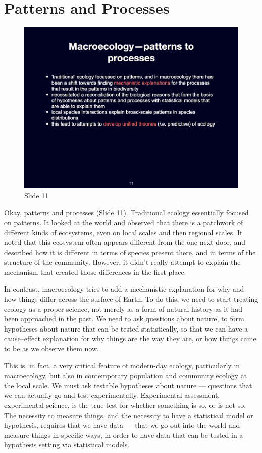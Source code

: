 \documentclass[
  11pt,
]{book}
\begin{document}
\section{Patterns and Processes}\label{patterns-and-processes}

\begin{figure}[ht]
\centering
\includegraphics[width=0.8\linewidth]{../images/BDC334/BDC334-011.jpeg}
\caption*{Slide 11}
\end{figure}

Okay, patterns and processes (Slide 11). Traditional ecology essentially
focused on patterns. It looked at the world and observed that there is a
patchwork of different kinds of ecosystems, even on local scales and
then regional scales. It noted that this ecosystem often appears
different from the one next door, and described how it is different in
terms of species present there, and in terms of the structure of the
community. However, it didn't really attempt to explain the mechanism
that created those differences in the first place.

In contrast, macroecology tries to add a mechanistic explanation for why
and how things differ across the surface of Earth. To do this, we need
to start treating ecology as a proper science, not merely as a form of
natural history as it had been approached in the past. We need to ask
questions about nature, to form hypotheses about nature that can be
tested statistically, so that we can have a cause--effect explanation
for why things are the way they are, or how things came to be as we
observe them now.

This is, in fact, a very critical feature of modern-day ecology,
particularly in macroecology, but also in contemporary population and
community ecology at the local scale. We must ask testable hypotheses
about nature --- questions that we can actually go and test
experimentally. Experimental assessment, experimental science, is the
true test for whether something is so, or is not so. The necessity to
measure things, and the necessity to have a statistical model or
hypothesis, requires that we have data --- that we go out into the world
and measure things in specific ways, in order to have data that can be
tested in a hypothesis setting via statistical models.
\end{document}

